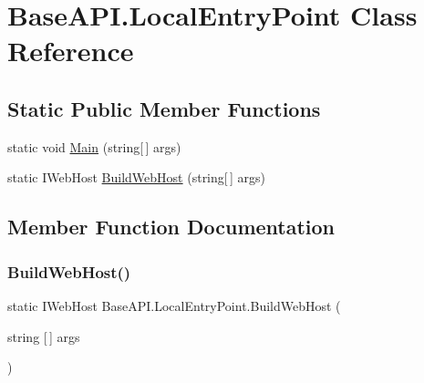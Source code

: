 \hypertarget{class_base_a_p_i_1_1_local_entry_point}{}\section{Base\+A\+P\+I.\+Local\+Entry\+Point Class Reference}
\label{class_base_a_p_i_1_1_local_entry_point}
\subsection*{Static Public Member Functions}
\begin{DoxyCompactItemize}
\item 
static void \mbox{\hyperlink{class_base_a_p_i_1_1_local_entry_point_a4b30ef1452807dfa3900d0e65663063b}{Main}} (string\mbox{[}$\,$\mbox{]} args)
\item 
static I\+Web\+Host \mbox{\hyperlink{class_base_a_p_i_1_1_local_entry_point_a9277e59343cb2fe3e6655fd8ab9a44f8}{Build\+Web\+Host}} (string\mbox{[}$\,$\mbox{]} args)
\end{DoxyCompactItemize}


\subsection{Member Function Documentation}
\mbox{\label{class_base_a_p_i_1_1_local_entry_point_a9277e59343cb2fe3e6655fd8ab9a44f8}} 
\subsubsection{\texorpdfstring{BuildWebHost()}{BuildWebHost()}}
{\footnotesize\ttfamily static I\+Web\+Host Base\+A\+P\+I.\+Local\+Entry\+Point.\+Build\+Web\+Host (\begin{DoxyParamCaption}\item[{string \mbox{[}$\,$\mbox{]}}]{args }\end{DoxyParamCaption})\hspace{0.3cm}{\ttfamily [static]}}

\mbox{\label{class_base_a_p_i_1_1_local_entry_point_a4b30ef1452807dfa3900d0e65663063b}} 
